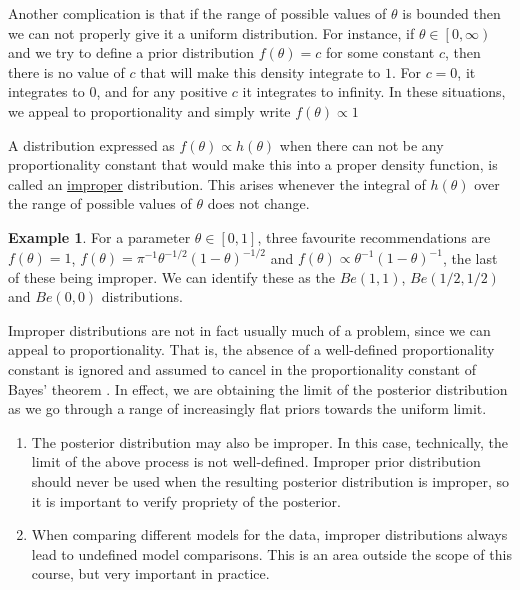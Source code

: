 \documentclass[lecture,12pt,]{pcms-l}
\numberwithin{section}{chapter}
\numberwithin{equation}{chapter}
\theoremstyle{plain}
\theoremstyle{definition}
\newtheorem{example}{Example}[section]
\theoremstyle{definition}
\begin{document}
Another complication is that if the range of possible values of $\theta$ is bounded then we can not properly give it a uniform distribution. For instance, if $\theta \in \left [ 0, \infty \right) $ and we try to define a prior distribution $f(\theta)=c$ for some constant $c$, then there is no value of $c$ that will make this density integrate to $1$. For $c=0$, it integrates to $0$, and for any positive $c$ it integrates to infinity. In these situations, we appeal to proportionality and simply write $f(\theta) \propto 1$

A distribution expressed as $f(\theta) \propto h(\theta)$ when there can not be any proportionality constant that would make this into a proper density function, is called an \underline{improper} distribution. This arises whenever the integral of $h(\theta)$ over the range of possible values of $\theta$ does not change.

\begin{example}
For a parameter $\theta \in \left [ 0, 1 \right ]$, three favourite recommendations are $f(\theta)=1$, $f(\theta)=\pi^{-1} \theta^{-1/2}(1-\theta)^{-1/2}$ and $f(\theta)\propto \theta^{-1} (1-\theta)^{-1}$, the last of these being improper. We can identify these as the $Be(1,1)$, $Be(1/2,1/2)$ and $Be(0,0)$ distributions.
\end{example}

Improper distributions are not in fact usually much of a problem, since we can appeal to proportionality. That is, the absence of a well-defined proportionality constant is ignored and assumed to cancel in the proportionality constant of Bayes' theorem \cite{Gamerman}. In effect, we are obtaining the limit of the posterior distribution as we go through a range of increasingly flat priors towards the uniform limit.

\begin{enumerate}
\item The posterior distribution may also be improper. In this case, technically, the limit of the above process is not well-defined. Improper prior distribution should never be used when the resulting posterior distribution is improper, so it is important to verify propriety of the posterior.
\item When comparing different models for the data, improper distributions always lead to undefined model comparisons. This is an area outside the scope of this course, but very important in practice.
\end{enumerate}
\end{document}
